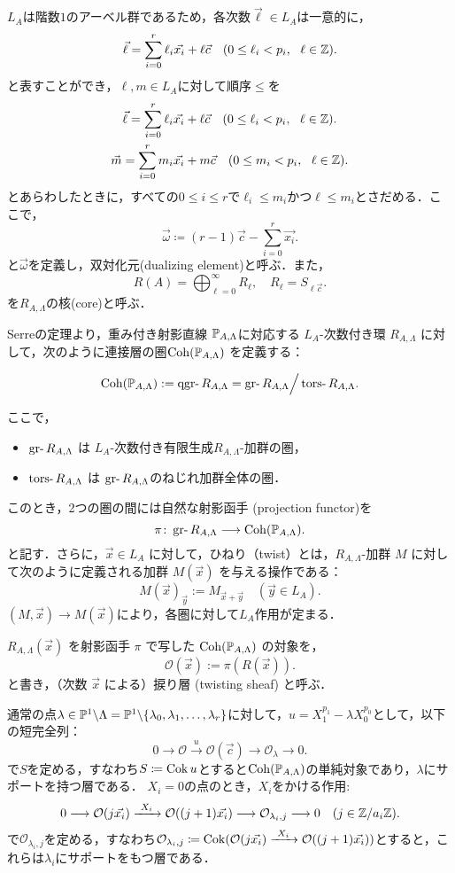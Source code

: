 $L_A$は階数$1$のアーベル群であるため，各次数$\vec{\ell}\in L_A$は一意的に，
\[\vec{\ell} = \sum_{i=0}^r \ell_i\vec{x_i} + \ell\vec{c}\quad (0\le \ell_i < p_i,\ \ \ell \in {\mathbb Z}).\]
と表すことができ，$\ell,m\in L_A$に対して順序$\le$を
\begin{gather*}
\vec{\ell} = \sum_{i=0}^r \ell_i\vec{x_i} + \ell\vec{c}\quad (0\le \ell_i < p_i,\ \ \ell \in \ZZ).\\
\vec{m} = \sum_{i=0}^r m_i\vec{x_i} + m\vec{c}\quad (0\le m_i < p_i,\ \ \ell \in \ZZ).
\end{gather*}
とあらわしたときに，すべての$0\le i\le r$で$\ell_i\le m_i$かつ$\ell\le m_i$とさだめる．ここで，
\[\vec{\omega} \coloneq (r-1)\vec{c} - \sum_{i=0}^r\vec{x_i}.\]
と$\vec{\omega}$を定義し，双対化元(dualizing element)と呼ぶ．また，
\[R(A)= \bigoplus_{\ell=0}^\infty R_{\ell},\quad R_\ell = S_{\ell\vec{c}}.\]
を$R_{A,\Lambda}$の核(core)と呼ぶ．

\begin{defn}\cite{GL87}
	Serreの定理より，重み付き射影直線 ${\mathbb P}_{A,\Lambda}$に対応する $L_A$-次数付き環 $R_{A,\Lambda}$ に対して，次のように連接層の圏$\operatorname{\mathrm{Coh}}({\mathbb P}_{A,\Lambda})$ を定義する：

\[
	\Coh(\PP_{A,\Lambda}) := \qgr R_{A,\Lambda} = \gr R_{A,\Lambda}\Big{/}\tors R_{A,\Lambda}.
\]

ここで，
\begin{itemize}
	\item $\gr R_{A,\Lambda}$ は $L_A$-次数付き有限生成$R_{A,\Lambda}$-加群の圏，
	\item $\tors R_{A,\Lambda}$ は $\gr R_{A,\Lambda}$のねじれ加群全体の圏．
\end{itemize}
このとき，2つの圏の間には自然な射影函手 (projection functor)を
\[ \pi\colon \gr R_{A,\Lambda} \longrightarrow \Coh(\PP_{A,\Lambda}) .\]
と記す．さらに，$\vec{x} \in L_A$ に対して，ひねり（twist）とは，$R_{A,\Lambda}$-加群 $M$ に対して次のように定義される加群 $M(\vec{x})$ を与える操作である：
\[
M(\vec{x})_{\vec{y}} := M_{\vec{x} + \vec{y}} \quad (\vec{y} \in L_A).
\]
$(M,\vec{x})\to M(\vec{x})$により，各圏に対して$L_A$作用が定まる．
\end{defn}
$R_{A,\Lambda}(\vec{x})$ を射影函手 $\pi$ で写した $\operatorname{\mathrm{Coh}}({\mathbb P}_{A,\Lambda})$ の対象を，
\[ \mathcal{O}(\vec{x}) := \pi(R(\vec{x})). \]
と書き，（次数 $\vec{x}$ による）捩り層 (twisting sheaf) と呼ぶ．

通常の点$\lambda\in{\mathbb P}^1\backslash\Lambda = {\mathbb P}^1\backslash\{\lambda_0,\lambda_1,\ldots, \lambda_r\}$に対して，$u = X_1^{p_1} - \lambda X_0^{p_0}$として，以下の短完全列：
\[0\longrightarrow \mathcal{O}\xrightarrow{\ u\ }\mathcal{O}(\vec{c})\longrightarrow \mathcal{O}_{\lambda}\longrightarrow 0.\]
で$S$を定める，すなわち$S\coloneq \operatorname{Cok} u $とすると$\operatorname{\mathrm{Coh}}({\mathbb P}_{A,\Lambda})$の単純対象であり，$\lambda$にサポートを持つ層である．
$X_i=0$の点のとき，$X_i$をかける作用:
\[0\longrightarrow \mathcal{O}(j\vec{x_i})\xrightarrow{\ X_i\ }\mathcal{O}((j+1)\vec{x_i})\longrightarrow \mathcal{O}_{\lambda_i,j}\longrightarrow 0\quad (j\in \ZZ/a_i\ZZ).\]
で$\mathcal{O}_{\lambda_i,j}$を定める，すなわち$\mathcal{O}_{\lambda_i,j}\coloneq \Cok (\mathcal{O}(j\vec{x_i})\xrightarrow{\ X_i\ }\mathcal{O}((j+1)\vec{x_i}))$とすると，これらは$\lambda_i$にサポートをもつ層である．

